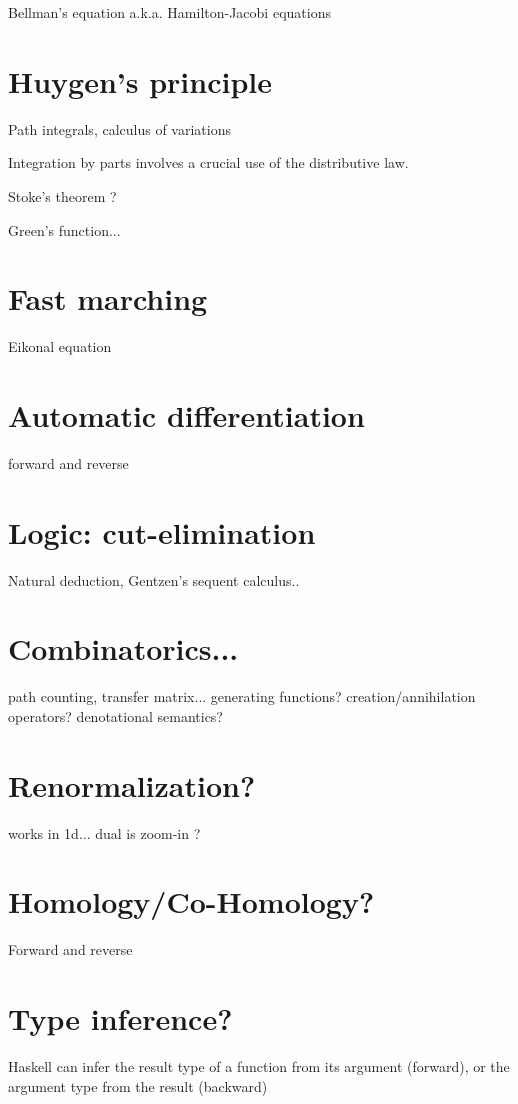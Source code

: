 \documentclass[12pt]{article}
\begin{document}
Bellman's equation a.k.a. Hamilton-Jacobi equations

\section{Huygen's principle}

Path integrals, calculus of variations

Integration by parts involves a crucial use of the distributive law.

Stoke's theorem ? %

Green's function...

\section{Fast marching}

Eikonal equation

\section{Automatic differentiation}

forward and reverse

\section{Logic: cut-elimination}

Natural deduction, Gentzen's sequent calculus..

\section{Combinatorics...}

path counting, transfer matrix...
generating functions? 
creation/annihilation operators?
denotational semantics?

\section{Renormalization?}

works in 1d... dual is zoom-in ?

\section{Homology/Co-Homology?}

Forward and reverse

\section{Type inference?}

 Haskell can infer the result type of a function from its argument (forward), or the argument type from the result (backward)

{}

\end{document}
